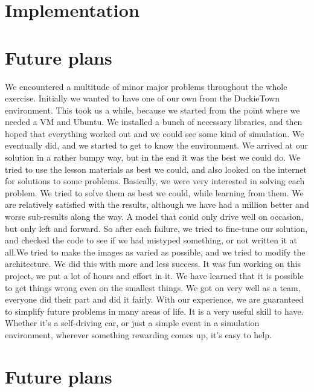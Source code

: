 \documentclass{article}
\begin{document}

\section*{Implementation}

\vspace*{2\baselineskip}

\section*{Future plans}

We encountered a multitude of minor major problems throughout the whole exercise. Initially we wanted to have one of our own from the DuckieTown environment. This took us a while, because we started from the point where we needed a VM and Ubuntu. We installed a bunch of necessary libraries, and then hoped that everything worked out and we could see some kind of simulation.
We eventually did, and we started to get to know the environment. We arrived at our solution in a rather bumpy way, but in the end it was the best we could do. We tried to use the lesson materials as best we could, and also looked on the internet for solutions to some problems. Basically, we were very interested in solving each problem. We tried to solve them as best we could, while learning from them. We are relatively satisfied with the results, although we have had a million better and worse sub-results along the way. A model that could only drive well on occasion, but only left and forward. So after each failure, we tried to fine-tune our solution, and checked the code to see if we had mistyped something, or not written it at all.We tried to make the images as varied as possible, and we tried to modify the architecture. We did this with more and less success.  It was fun working on this project, we put a lot of hours and effort in it. We have learned that it is possible to get things wrong even on the smallest things. We got on very well as a team, everyone did their part and did it fairly. With our experience, we are guaranteed to simplify future problems in many areas of life. It is a very useful skill to have. Whether it's a self-driving car, or just a simple event in a simulation environment, wherever something rewarding comes up, it's easy to help.

\section*{Future plans}
\pagebreak
\end{document}
